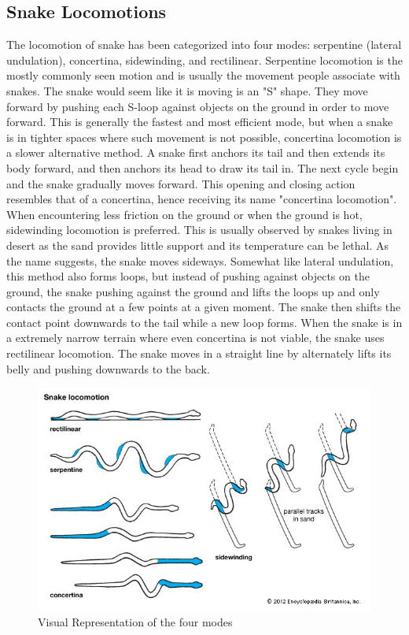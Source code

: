 \documentclass[twoside, 11pt]{article}
\begin{document}
\subsection{Snake Locomotions}
The locomotion of snake has been categorized into four modes: serpentine (lateral undulation), concertina, sidewinding, and rectilinear. Serpentine locomotion is the mostly commonly seen motion and is usually the movement people associate with snakes. The snake would seem like it is moving is an "S" shape. They move forward by pushing each S-loop against objects on the ground in order to move forward. This is generally the fastest and most efficient mode, but when a snake is in tighter spaces where such movement is not possible, concertina locomotion is a slower alternative method. A snake first anchors its tail and then extends its body forward, and then anchors its head to draw its tail in. The next cycle begin and the snake gradually moves forward. This opening and closing action resembles that of a concertina, hence receiving its name "concertina locomotion". When encountering less friction on the ground or when the ground is hot, sidewinding locomotion is preferred. This is usually observed by snakes living in desert as the sand provides little support and its temperature can be lethal. As the name suggests, the snake moves sideways. Somewhat like lateral undulation, this method also forms loops, but instead of pushing against objects on the ground, the snake pushing against the ground and lifts the loops up and only contacts the ground at a few points at a given moment. The snake then shifts the contact point downwards to the tail while a new loop forms. When the snake is in a extremely narrow terrain where even concertina is not viable, the snake uses rectilinear locomotion. The snake moves in a straight line by alternately lifts its belly and pushing downwards to the back. 


\begin{figure}[H]
\centering
\includegraphics[width=0.5\linewidth]{snake-motion}
\caption{Visual Representation of the four modes}
\end{figure}
\end{document}
